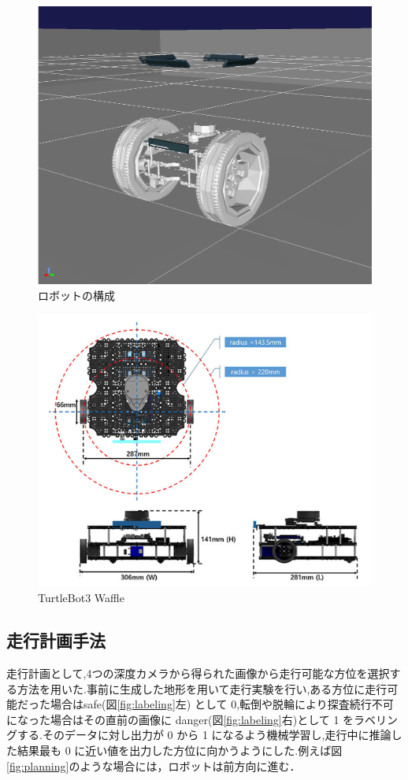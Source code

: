 \documentclass[uplatex,twocolumn, dvipdfmx]{jsarticle}  %
\begin{document}
\begin{figure}[t]
  \begin{center}
   \includegraphics[width=0.7\linewidth]{images/robot_visual.png}
   \caption{ロボットの構成}
   \label{fig:fig}
  \end{center}
 \end{figure}


\begin{figure}[t]
  \begin{center}
   \includegraphics[width=1.0\linewidth]{images/turtlebot.png}
   \caption{TurtleBot3 Waffle}
   \label{fig:turtlebot}
  \end{center}
 \end{figure}


\subsection{走行計画手法}
走行計画として,4つの深度カメラから得られた画像から走行可能な方位を選択する方法を用いた.事前に生成した地形を用いて走行実験を行い,ある方位に走行可能だった場合はsafe(図\ref{fig:labeling}左) として 0,転倒や脱輪により探査続行不可になった場合はその直前の画像に danger(図\ref{fig:labeling}右)として 1 をラベリングする.そのデータに対し出力が 0 から 1 になるよう機械学習し,走行中に推論した結果最も 0 に近い値を出力した方位に向かうようにした.例えば図\ref{fig:planning}のような場合には，ロボットは前方向に進む．
\end{document}
